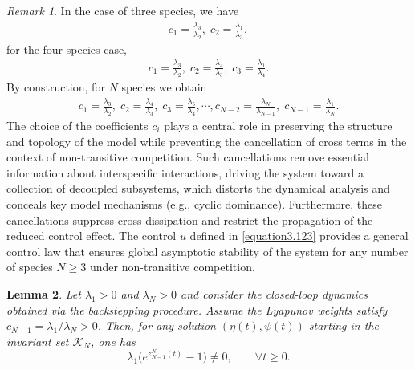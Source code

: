\documentclass[10pt, a4paper]{amsart}
\theoremstyle{plain}
\newtheorem{lemma}{Lemma}[section]
\theoremstyle{definition}
\theoremstyle{remark}
\newtheorem{remark}[lemma]{Remark}
\numberwithin{equation}{section}
\begin{document}
\begin{remark}
In the case of three species, we have 
\begin{align}
c_1=\frac{\lambda_3}{\lambda_2},\; c_2=\frac{\lambda_1}{\lambda_3},
\end{align}
for the four-species case, 
\begin{align}
c_1=\frac{\lambda_3}{\lambda_2},\; c_2=\frac{\lambda_4}{\lambda_3},\; c_3=\frac{\lambda_1}{\lambda_4}.
\end{align}
By construction, for $N$ species we obtain \begin{align}
c_1=\frac{\lambda_3}{\lambda_2},\; c_2=\frac{\lambda_4}{\lambda_3},\;c_3=\frac{\lambda_5}{\lambda_4},\cdots,c_{N-2}=\frac{\lambda_{N}}{\lambda_{N-1}},\;c_{N-1}=\frac{\lambda_1}{\lambda_{N}}.
\end{align}
The choice of the coefficients $c_i$ plays a central role in preserving the structure and topology of the model while preventing the cancellation of cross terms in the context of non-transitive competition. Such cancellations remove essential information about interspecific interactions, driving the system toward a collection of decoupled subsystems, which distorts the dynamical analysis and conceals key model mechanisms (e.g., cyclic dominance). Furthermore, these cancellations suppress cross dissipation and restrict the propagation of the reduced control effect. The control $u$ defined in \eqref{equation3.123} provides a general control law that ensures global asymptotic stability of the system for any number of species $N\geq 3$ under non-transitive competition.%
\end{remark}
\begin{lemma}\label{lemB.1}
Let $\lambda_1>0$ and $\lambda_{N}>0$ and consider the closed-loop dynamics obtained via the backstepping procedure. 
Assume the Lyapunov weights satisfy $c_{N-1}=\lambda_1/\lambda_{N}>0$. 
Then, for any solution $(\eta(t),\psi(t))$ starting in the invariant set $\mathcal K_N$, one has
\[
\lambda_1\big(e^{z^N_{N-1}(t)}-1\big)\neq 0, \qquad \forall t\ge 0 .
\]
\end{lemma}
\end{document}
